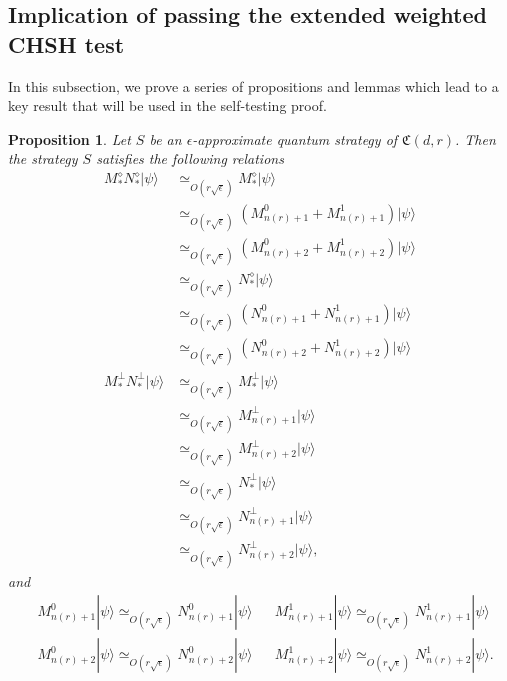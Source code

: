 \documentclass[11pt,letterpaper]{article}
\newcommand{\ket}[1]{|#1\rangle}
\newcommand{\1}{\mathbb{1}}
\newcommand{\nr}{n(r)}
\newcommand{\fC}{\mathfrak{C}}
\newcommand{\ep}{\epsilon}
\newcommand{\se}{\sqrt{\epsilon}}
\newcommand{\appd}[1]{\simeq_{#1}}
\newtheorem{proposition}[theorem]{Proposition}
\theoremstyle{definition}
\begin{document}
\subsection{Implication of passing the extended weighted CHSH test}
\label{sec:imp_chsh}
In this subsection, we prove a series of propositions and lemmas which lead to a key result that will be
used in the self-testing proof.
\begin{proposition}
\label{prop:chsh_base}
Let $S$ be an $\ep$-approximate quantum strategy of $\fC(d,r)$.
Then the strategy $S$ satisfies the following relations
\begin{align*}
	  M_\ast^\diamond N_\ast^\diamond \ket{\psi}
	  &\appd{O( r\se)}M_\ast^\diamond \ket{\psi}\\
	  &\appd{O( r\se)} (M_{\nr+1}^0+M_{\nr+1}^1)\ket{\psi}\\
	  &\appd{O( r\se)} (M_{\nr+2}^0+M_{\nr+2}^1)\ket{\psi} \\
	  &\appd{O( r\se)} N_\ast^\diamond \ket{\psi}\\
	  &\appd{O( r\se)} (N_{\nr+1}^0+N_{\nr+1}^1)\ket{\psi}\\
	  &\appd{O( r\se)} (N_{\nr+2}^0+N_{\nr+2}^1)\ket{\psi}\\
	M_\ast^\perp N_\ast^\perp\ket{\psi}&\appd{O( r\se)} M_\ast^\perp\ket{\psi}\\
	&\appd{O( r\se)} M_{\nr+1}^\perp \ket{\psi}\\
	&\appd{O( r\se)} M_{\nr+2}^\perp \ket{\psi}\\
	&\appd{O( r\se)} N_\ast^\perp\ket{\psi}\\
	&\appd{O( r\se)} N_{\nr+1}^\perp \ket{\psi}\\
	&\appd{O( r\se)} N_{\nr+2}^\perp \ket{\psi},
\end{align*}
and
\begin{align*}
&M_{\nr+1}^0 \ket{\psi} \appd{O( r\se)} N_{\nr+1}^0 \ket{\psi} && M_{\nr+1}^1\ket{\psi} \appd{O( r\se)} N_{\nr+1}^1 \ket{\psi}\\
&M_{\nr+2}^0 \ket{\psi} \appd{O( r\se)} N_{\nr+2}^0 \ket{\psi} && M_{\nr+2}^1\ket{\psi} \appd{O( r\se)} N_{\nr+2}^1 \ket{\psi}.
\end{align*}
\end{proposition}
\end{document}
